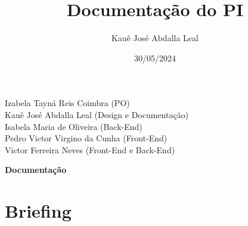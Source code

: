 \documentclass{article}
\title{Documentação do PI}
\author{Kauê José Abdalla Leal}
\date{30/05/2024}
\begin{document}
\maketitle

\begin{center}
      Izabela Tayná Reis Coimbra (PO)\\
      Kauê José Abdalla Leal (Design e Documentação)\\
      Isabela Maria de Oliveira (Back-End)\\
      Pedro Victor Virgino da Cunha (Front-End)\\
      Victor Ferreira Neves (Front-End e Back-End)
\end{center}

\newpage

\begin{center}
      \textbf{Documentação}
\end{center}


\section{Briefing}
\end{document}
